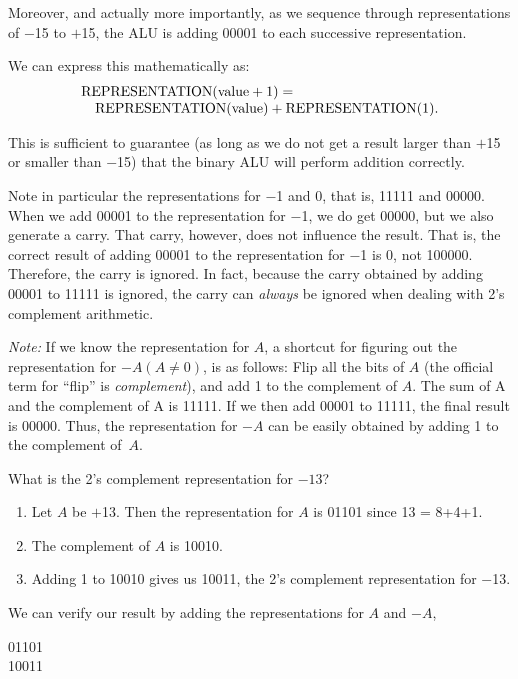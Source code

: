 \documentclass{patt}
\begin{document}
Moreover, and actually more importantly, as we sequence through representations 
of $-$15 to $+$15, the ALU is adding 00001 to each successive
representation.

We can express this mathematically as:
\begin{align*}
&\text{REPRESENTATION(value${}+{}$1)}=\\[-\jot]
&\quad\text{REPRESENTATION(value)} + \text{REPRESENTATION(1).}
\end{align*}

This is sufficient to guarantee (as long as we do not get a result
larger than $+$15 or smaller than $-$15) that the binary ALU will
perform addition correctly.

Note in particular the representations for $-$1 and 0, that is, 11111
and 00000.  When we add 00001 to the representation for $-$1, we do
get 00000, but we also generate a carry.  That carry, however, does not
influence the result.  That is, the correct result of adding 00001 to
the representation for $-$1 is 0, not 100000.  Therefore, the carry is
ignored.  In fact, because the carry obtained by adding 00001 to 11111
is ignored, the carry can {\em always} be ignored when dealing with
2's complement arithmetic.

{\em Note:} If we know the representation for $A$, a shortcut for figuring 
out the representation for $-A(A\ne0)$, is as follows:
Flip all the bits of $A$ (the official term for ``flip'' is
{\em complement}), and add 1 to the complement of $A$. The
sum of A and the complement of A is 11111.  If we then add 00001 to 11111, the final
result is 00000.  Thus, the representation for $-A$ can be
easily obtained by adding 1 to the complement of~$A$.

\begin{example}
What is the 2's complement representation for ${-}13$?

\begin{enumerate}
\item Let $A$ be $+$13. Then the representation for $A$ is 01101 
since 13 = 8+4+1.
\item The complement of $A$ is 10010.
\item Adding 1 to 10010 gives us 10011, the 2's complement representation for $-$13.
\end{enumerate}
We can verify our result by adding the representations for $A$ and
$-A$,
\begin{cctable}
01101\\
10011\\
\\[-8pt]
\end{cctable}
\end{example}
\end{document}
